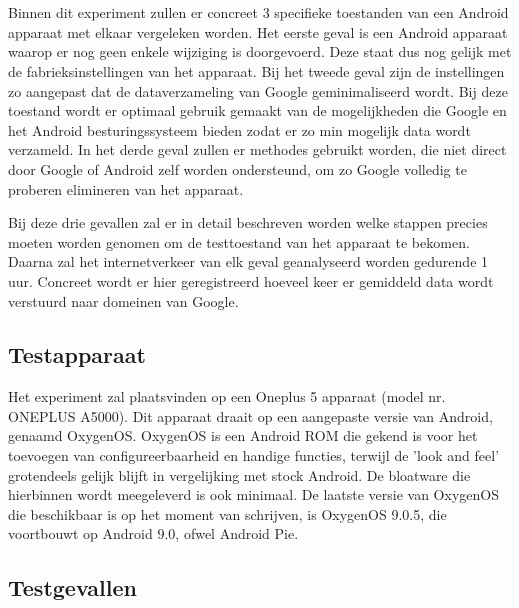 
\chapter{}
\label{ch:methodologie}

Binnen dit experiment zullen er concreet 3 specifieke toestanden van een Android apparaat met elkaar vergeleken worden. Het eerste geval is een Android apparaat waarop er nog geen enkele wijziging is doorgevoerd. Deze staat dus nog gelijk met de fabrieksinstellingen van het apparaat. Bij het tweede geval zijn de instellingen zo aangepast dat de dataverzameling van Google geminimaliseerd wordt. Bij deze toestand wordt er optimaal gebruik gemaakt van de mogelijkheden die Google en het Android besturingssysteem bieden zodat er zo min mogelijk data wordt verzameld. In het derde geval zullen er methodes gebruikt worden, die niet direct door Google of Android zelf worden ondersteund, om zo Google volledig te proberen elimineren van het apparaat.

Bij deze drie gevallen zal er in detail beschreven worden welke stappen precies moeten worden genomen om de testtoestand van het apparaat te bekomen. Daarna zal het internetverkeer van elk geval geanalyseerd worden gedurende 1 uur. Concreet wordt er hier geregistreerd hoeveel keer er gemiddeld data wordt verstuurd naar domeinen van Google.

\section{Testapparaat}
\label{sec:testapparaat}
Het experiment zal plaatsvinden op een Oneplus 5 apparaat (model nr. ONEPLUS A5000). Dit apparaat draait op een aangepaste versie van Android, genaamd OxygenOS. OxygenOS is een Android ROM die gekend is voor het toevoegen van configureerbaarheid en handige functies, terwijl de 'look and feel' grotendeels gelijk blijft in vergelijking met stock Android. De bloatware die hierbinnen wordt meegeleverd is ook minimaal. De laatste versie van OxygenOS die beschikbaar is op het moment van schrijven, is OxygenOS 9.0.5, die voortbouwt op Android 9.0, ofwel Android Pie.

\section{Testgevallen}
\label{sec:testgevallen}

